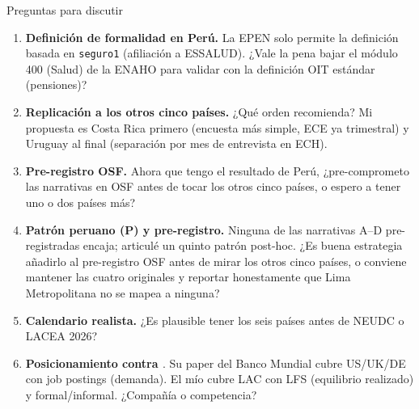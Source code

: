 \documentclass[9pt, aspectratio=169]{beamer}
\begin{document}
\begin{frame}{Preguntas para discutir}
  \small
  \begin{enumerate}
    \setlength\itemsep{0.45em}
    \item \textbf{Definición de formalidad en Perú.} La EPEN solo permite la definición basada en \texttt{seguro1} (afiliación a ESSALUD). ¿Vale la pena bajar el módulo 400 (Salud) de la ENAHO para validar con la definición OIT estándar (pensiones)?
    \item \textbf{Replicación a los otros cinco países.} ¿Qué orden recomienda? Mi propuesta es Costa Rica primero (encuesta más simple, ECE ya trimestral) y Uruguay al final (separación por mes de entrevista en ECH).
    \item \textbf{Pre-registro OSF.} Ahora que tengo el resultado de Perú, ¿pre-comprometo las narrativas en OSF antes de tocar los otros cinco países, o espero a tener uno o dos países más?
    \item \textbf{Patrón peruano (P) y pre-registro.} Ninguna de las narrativas A--D pre-registradas encaja; articulé un quinto patrón post-hoc. ¿Es buena estrategia añadirlo al pre-registro OSF antes de mirar los otros cinco países, o conviene mantener las cuatro originales y reportar honestamente que Lima Metropolitana no se mapea a ninguna?
    \item \textbf{Calendario realista.} ¿Es plausible tener los seis países antes de NEUDC o LACEA 2026?
    \item \textbf{Posicionamiento contra \citet{LiuWangYu2025_labor_demand}}. Su paper del Banco Mundial cubre US/UK/DE con job postings (demanda). El mío cubre LAC con LFS (equilibrio realizado) y formal/informal. ¿Compañía o competencia?
  \end{enumerate}
\end{frame}
\end{document}
